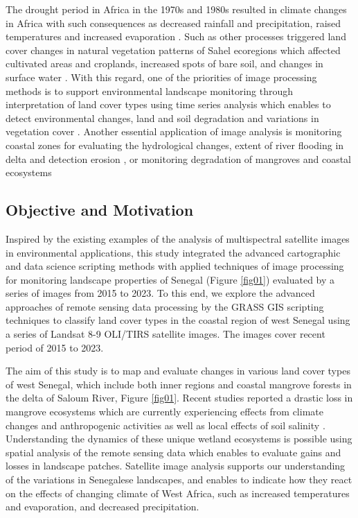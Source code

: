 \documentclass[earth,article,submit,pdftex,moreauthors]{Definitions/mdpi}
\begin{document}
The drought period in Africa in the 1970s and 1980s resulted in climate changes in Africa with such consequences as decreased rainfall and precipitation, raised temperatures and increased evaporation \cite{Paturel,Lemenkova202217}. Such as other processes triggered land cover changes in natural vegetation patterns of Sahel ecoregions which affected cultivated areas and croplands, increased spots of bare soil, and changes in surface water \cite{Fritz,Lemenkova202313}. With this regard, one of the priorities of image processing methods is to support environmental landscape monitoring through interpretation of land cover types using time series analysis which enables to detect environmental changes, land and soil degradation and  variations in vegetation cover \cite{MBOW2008210}. Another essential application of image analysis is monitoring coastal zones for evaluating the hydrological changes, extent of river flooding in delta and detection erosion \cite{NDOUR201892,NGOM201634}, or monitoring degradation of mangroves and coastal ecosystems \cite{LOMBARD2023102027,CARNEY2014126}

\subsection{Objective and Motivation}

Inspired by the existing examples of the analysis of multispectral satellite images in environmental applications, this study integrated the advanced cartographic and data science scripting methods with applied techniques of image processing for monitoring landscape properties of Senegal (Figure \ref{fig01}) evaluated by a series of images from 2015 to 2023. To this end, we explore the advanced approaches of remote sensing data processing by the GRASS GIS scripting techniques to classify land cover types in the coastal region of west Senegal using a series of Landsat 8-9 OLI/TIRS satellite images. The images cover recent period of 2015 to 2023. 

The aim of this study is to map and evaluate changes in various land cover types of west Senegal, which include both inner regions and coastal mangrove forests in the delta of Saloum River, Figure \ref{fig01}. Recent studies reported a drastic loss in mangrove ecosystems which are currently experiencing effects from climate changes and anthropogenic activities \cite{ANDRIEU2020117963} as well as local effects of soil salinity \cite{Devaney}. Understanding the dynamics of these unique wetland ecosystems is possible using spatial analysis of the remote sensing data which enables to evaluate  gains and losses in landscape patches. Satellite image analysis supports our understanding of the variations in  Senegalese landscapes, and enables to indicate how they react on the effects of changing climate of West Africa, such as increased temperatures and evaporation, and decreased precipitation. 
\end{document}
